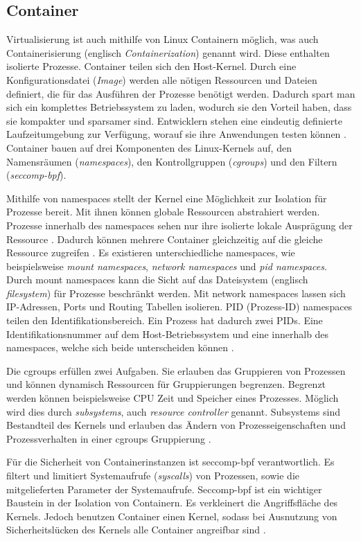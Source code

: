\subsection{Container}
Virtualisierung ist auch mithilfe von Linux Containern möglich,
was auch Containerisierung (englisch \emph{Containerization})
genannt wird. Diese enthalten isolierte Prozesse.
Container teilen sich den Host-Kernel. Durch eine
Konfigurationsdatei (\emph{Image}) werden alle
nötigen Ressourcen und Dateien definiert, die für das Ausführen
der Prozesse benötigt werden. Dadurch spart man sich ein komplettes
Betriebssystem zu laden, wodurch sie den Vorteil haben,
dass sie kompakter und sparsamer sind. Entwicklern stehen eine eindeutig
definierte Laufzeitumgebung zur Verfügung, worauf sie ihre Anwendungen testen können
\cite{RedHatContainer}. Container bauen auf drei Komponenten
des Linux-Kernels auf, den Namensräumen
(\emph{namespaces}),
den Kontrollgruppen
(\emph{cgroups})
und den Filtern (\emph{seccomp-bpf}).

Mithilfe von namespaces stellt der Kernel eine Möglichkeit zur Isolation
für Prozesse bereit. Mit ihnen können globale Ressourcen abstrahiert werden.
Prozesse innerhalb des namespaces sehen nur ihre isolierte lokale
Ausprägung der Ressource \cite{UbuntuNamespaces}.
Dadurch können mehrere Container gleichzeitig auf die gleiche
Ressource zugreifen \cite{RedHatIntroToLinuxContainers}.
Es existieren unterschiedliche namespaces, wie beispielsweise
\emph{mount namespaces}, \emph{network namespaces}
und \emph{pid namespaces}.
Durch mount namespaces kann die Sicht auf das Dateisystem
(englisch \emph{filesystem}) für Prozesse beschränkt werden.
Mit network namespaces lassen sich IP-Adressen, Ports
und Routing Tabellen isolieren. PID (Prozess-ID) namespaces teilen
den Identifikationsbereich. Ein Prozess hat dadurch zwei
PIDs. Eine Identifikationsnummer auf dem Host-Betriebssystem und eine
innerhalb des namespaces, welche sich beide unterscheiden können
\cite{LwnDotNetNamespaces}.

Die cgroups erfüllen zwei Aufgaben. Sie erlauben das Gruppieren
von Prozessen und können dynamisch Ressourcen für Gruppierungen begrenzen.
Begrenzt werden können beispielsweise CPU Zeit und Speicher eines Prozesses.
Möglich wird dies durch \emph{subsystems},
auch \emph{resource controller} genannt. Subsystems sind Bestandteil
des Kernels und erlauben das Ändern von Prozesseigenschaften und
Prozessverhalten in einer cgroups Gruppierung \cite{RedHatIntroToLinuxContainers}.

Für die Sicherheit von Containerinstanzen ist seccomp-bpf 
verantwortlich. Es filtert und limitiert
Systemaufrufe (\emph{syscalls}) von Prozessen,
sowie die mitgelieferten Parameter der Systemaufrufe.
Seccomp-bpf ist ein wichtiger Baustein in der Isolation von
Containern. Es verkleinert die Angriffsfläche 
des Kernels. Jedoch benutzen Container einen
Kernel, sodass bei Ausnutzung von Sicherheitslücken
des Kernels alle Container angreifbar sind \cite{Firecracker}.

